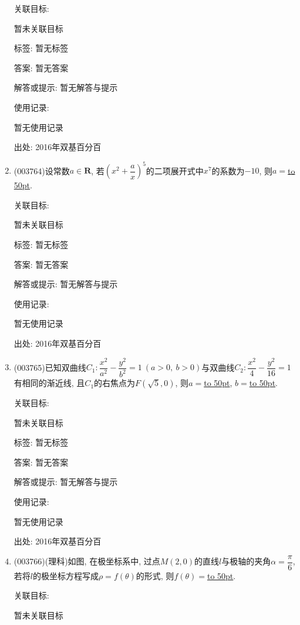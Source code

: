 \documentclass[10pt,a4paper]{article}
\newcommand{\blank}[1]{\underline{\hbox to #1pt{}}}
\begin{document}
\begin{enumerate}[1.]
关联目标:

暂未关联目标



标签: 暂无标签

答案: 暂无答案

解答或提示: 暂无解答与提示

使用记录:

暂无使用记录


出处: 2016年双基百分百
\item { (003764)}设常数$a\in \mathbf{R}$, 若$\left(x^2+\dfrac ax\right)^5$的二项展开式中$x^7$的系数为$-10$, 则$a=$\blank{50}.


关联目标:

暂未关联目标



标签: 暂无标签

答案: 暂无答案

解答或提示: 暂无解答与提示

使用记录:

暂无使用记录


出处: 2016年双基百分百
\item { (003765)}已知双曲线$C_1: \dfrac{x^2}{a^2}-\dfrac{y^2}{b^2}=1 \ (a>0,\ b>0)$与双曲线$C_2: \dfrac{x^2}{4}-\dfrac{y^2}{16}=1$有相同的渐近线, 且$C_1$的右焦点为$F(\sqrt{5},0)$, 则$a=$\blank{50}, $b=$\blank{50}.


关联目标:

暂未关联目标



标签: 暂无标签

答案: 暂无答案

解答或提示: 暂无解答与提示

使用记录:

暂无使用记录


出处: 2016年双基百分百
\item { (003766)}(理科)如图, 在极坐标系中, 过点$M(2,0)$的直线$l$与极轴的夹角$\alpha=\dfrac{\pi}{6}$, 若将$l$的极坐标方程写成$\rho=f(\theta)$的形式, 则$f(\theta)=$\blank{50}.
\begin{center}
\end{center}


关联目标:

暂未关联目标




\end{enumerate}
\end{document}
